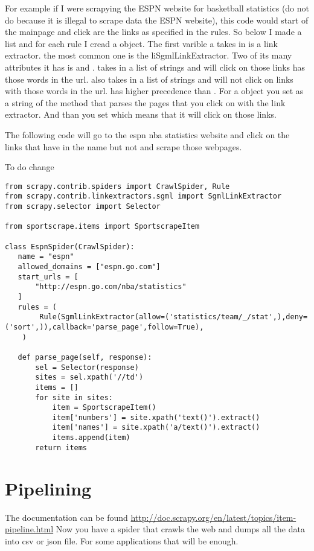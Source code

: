 For example if I were scrapying the ESPN website for basketball statistics (do not do because it is illegal to scrape data the ESPN website), this code would start of the mainpage and click are the links as specified in the rules.
So below I made a list and for each rule I cread a  object.
The first varible a takes in is a link extractor.
the most common one is the li{SgmlLinkExtractor}.
Two of its many attributes it has is  and .
 takes in a list of strings and will click on those links has those words in the url. 
 also takes in a list of strings and will not click on links with those words in the url.
 has higher precedence than .
For a  object you set  as a string of the method that parses the pages that you click on with the link extractor.
And than you set  which means that it will click on those links.

The following code will go to the espn nba statistics website and click on the links that have  in the name but not  and scrape those webpages.

To do change
\begin{lstlisting}
from scrapy.contrib.spiders import CrawlSpider, Rule
from scrapy.contrib.linkextractors.sgml import SgmlLinkExtractor
from scrapy.selector import Selector

from sportscrape.items import SportscrapeItem

class EspnSpider(CrawlSpider):
   name = "espn"
   allowed_domains = ["espn.go.com"]
   start_urls = [
       "http://espn.go.com/nba/statistics"
   ]
   rules = (
        Rule(SgmlLinkExtractor(allow=('statistics/team/_/stat',),deny=('sort',)),callback='parse_page',follow=True),
    )

   def parse_page(self, response):
       sel = Selector(response)
       sites = sel.xpath('//td')
       items = []
       for site in sites:
           item = SportscrapeItem()
           item['numbers'] = site.xpath('text()').extract()
           item['names'] = site.xpath('a/text()').extract()
           items.append(item)
       return items
\end{lstlisting}

\section*{Pipelining}

The documentation can be found \url{http://doc.scrapy.org/en/latest/topics/item-pipeline.html}
Now you have a spider that crawls the web and dumps all the data into csv or json file.
For some applications that will be enough. 

